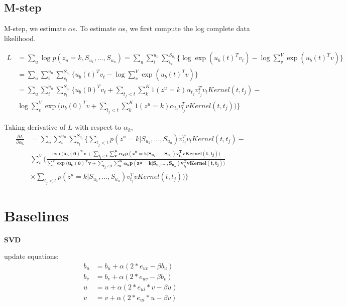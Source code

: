 \documentclass[11pt]{article}
\begin{document}

\subsection{M-step}
M-step, we estimate $\alpha$s.
To estimate $\alpha$s, we first compute the log complete data likelihood.

\begin{align*}
L &= \sum_u \log p(z_u=k,S_{u_1}, ..., S_{u_n}) = \sum_u \sum^{u_n}_{i} \sum^{S_{u_i}}_{v_t} \Big\{\log \exp(u_b(t)^Tv_t)-\log \sum_v^V \exp(u_b(t)^Tv)\Big\} \\
& = \sum_u \sum^{u_n}_{i} \sum^{S_{u_i}}_{v_t} \Big\{ u_b(t)^Tv_t-\log \sum_v^V \exp(u_b(t)^Tv)\Big\} \\
& = \sum_u \sum^{u_n}_{i} \sum^{S_{u_i}}_{v_t}\Big\{ u_b(0)^Tv_t+\sum_{t_j<t}\sum^{K}_k 1(z^u=k)\alpha_{t_j}v_{t_j}^Tv_t Kernel(t, t_j)-\\
 &\log \sum_v^V \exp\Big(u_b(0)^Tv+\sum_{t_j<t}\sum^K_k 1(z^u=k)\alpha_{t_j}v_{t_j}^Tv Kernel(t,t_j)\Big)\Big\}
\end{align*}

Taking derivative of $L$ with respect to $\alpha_k$, 
\begin{align}
\frac{\partial L}{\partial \alpha_k} &= \sum_u \sum^{u_n}_{i} \sum^{S_{u_i}}_{v_t}\Big\{\sum_{t_j<t} p(z^u=k|S_{u_1}, ..., S_{u_n})v_{t_j}^Tv_tKernel(t, t_j)-\\
&\sum_v^V\Big(\frac{\exp\big( \boldsymbol{u_b(0)^Tv+\sum_{t_j<t}\sum_k^K \alpha_k p(z^u=k|S_{u_1}, ..., S_{u_n})v_{t_j}^T v Kernel(t, t_j)}\big )}{\sum_v^V \exp\big(\boldsymbol{u_b(0)^Tv+\sum_{t_j<t} \sum_k^K \alpha_k p(z^u=k|S_{u_1}, ..., S_{u_n})v_{t_j}^Tv Kernel(t, t_j)}\big)} \\
& \times \sum_{t_j<t}p(z^u=k|S_{u_1}, ..., S_{u_n})v_{t_j}^T v Kernel(t, t_j) \Big)
\Big\}
\end{align}

\section{Baselines}

\textbf{SVD}

update equations:
\begin{align*}
b_u &= b_u+\alpha(2*e_{uv}-\beta b_u) \\
b_v &= b_v+\alpha(2*e_{uv}-\beta b_v) \\
u &= u+\alpha(2*e_{ui}*v-\beta u) \\
v &= v+\alpha(2*e_{ui}*u-\beta v)
\end{align*}
\end{document}
